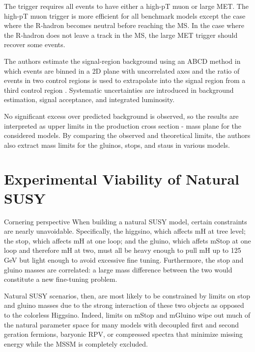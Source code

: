 \documentclass[12pt]{article}
\begin{document}
    The trigger requires all events to have either a high-pT muon or large MET. The high-pT muon trigger is more efficient for all benchmark models except the case where the R-hadron becomes neutral before reaching the MS. In the case where the R-hadron does not leave a track in the MS, the large MET trigger should recover some events.  

    The authors estimate the signal-region background using an ABCD method in which events are binned in a 2D plane with uncorrelated axes and the ratio of events in two control regions is used to extrapolate into the signal region from a third control region . Systematic uncertainties are introduced in background estimation, signal acceptance, and integrated luminosity.

    No significant excess over predicted background is observed, so the results are interpreted as upper limits in the production cross section - mass plane for the considered models. By comparing the observed and theoretical limits, the authors also extract mass limits for the gluinos, stops, and staus in various models. 

\section{Experimental Viability of Natural SUSY}
    Cornering perspective
        When building a natural SUSY model, certain constraints are nearly unavoidable. Specifically, the higgsino, which affects mH at tree level; the stop, which affects mH at one loop; and the gluino, which affets mStop at one loop and therefore mH at two, must all be heavy enough to pull mH up to 125 GeV but light enough to avoid excessive fine tuning. Furthermore, the stop and gluino masses are correlated: a large mass difference between the two would constitute a new fine-tuning problem.

        Natural SUSY scenarios, then, are most likely to be constrained by limits on stop and gluino masses due to the strong interaction of these two objects as opposed to the colorless Higgsino. Indeed, limits on mStop and mGluino wipe out much of the natural parameter space for many models with decoupled first and second geration fermions, baryonic RPV, or compressed spectra that minimize missing energy while the MSSM is completely excluded.   
\end{document}

